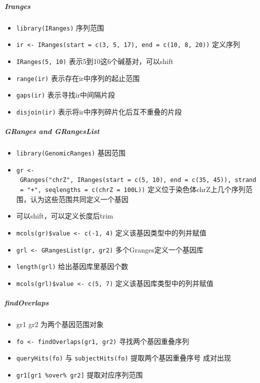 \documentclass[]{book}
\providecommand{\tightlist}{%
  \setlength{\itemsep}{0pt}\setlength{\parskip}{0pt}}
\let\oldsubparagraph\subparagraph
\renewcommand{\subparagraph}[1]{\oldsubparagraph{#1}\mbox{}}
\begin{document}
\hypertarget{iranges}{%
\subparagraph{Iranges}\label{iranges}}

\begin{itemize}
\tightlist
\item
  \texttt{library(IRanges)} 序列范围
\item
  \texttt{ir\ \textless{}-\ IRanges(start\ =\ c(3,\ 5,\ 17),\ end\ =\ c(10,\ 8,\ 20))} 定义序列
\item
  \texttt{IRanges(5,\ 10)} 表示5到10这6个碱基对，可以shift
\item
  \texttt{range(ir)} 表示存在ir中序列的起止范围
\item
  \texttt{gaps(ir)} 表示寻找ir中间隔片段
\item
  \texttt{disjoin(ir)} 表示将ir中序列碎片化后互不重叠的片段
\end{itemize}

\hypertarget{granges-and-grangeslist}{%
\subparagraph{GRanges and GRangesList}\label{granges-and-grangeslist}}

\begin{itemize}
\tightlist
\item
  \texttt{library(GenomicRanges)} 基因范围
\item
  \texttt{gr\ \textless{}-\ GRanges("chrZ",\ IRanges(start\ =\ c(5,\ 10),\ end\ =\ c(35,\ 45)),\ strand\ =\ "+",\ seqlengths\ =\ c(chrZ\ =\ 100L))} 定义位于染色体chrZ上几个序列范围，认为这些范围共同定义一个基因
\item
  可以shift，可以定义长度后trim
\item
  \texttt{mcols(gr)\$value\ \textless{}-\ c(-1,\ 4)} 定义该基因类型中的列并赋值
\item
  \texttt{grl\ \textless{}-\ GRangesList(gr,\ gr2)} 多个Granges定义一个基因库
\item
  \texttt{length(grl)} 给出基因库里基因个数
\item
  \texttt{mcols(grl)\$value\ \textless{}-\ c(5,\ 7)} 定义该基因库类型中的列并赋值
\end{itemize}

\hypertarget{findoverlaps}{%
\subparagraph{findOverlaps}\label{findoverlaps}}

\begin{itemize}
\tightlist
\item
  gr1 gr2 为两个基因范围对象
\item
  \texttt{fo\ \textless{}-\ findOverlaps(gr1,\ gr2)} 寻找两个基因重叠序列
\item
  \texttt{queryHits(fo)} 与 \texttt{subjectHits(fo)} 提取两个基因重叠序号 成对出现
\item
  \texttt{gr1{[}gr1\ \%over\%\ gr2{]}} 提取对应序列范围
\end{itemize}
\end{document}

